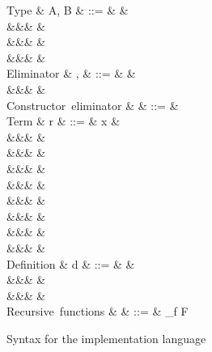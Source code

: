 \begin{figure}
\begin{syntaxfig}
\mbox{Type}
&
A, B
&
::=
&
\tyInt
&
\\
&&&
\tyList
&
\\
&&&
&
\\
&&&
&
\\[2mm]
\mbox{Eliminator}
&
\sigma, \tau
&
::=
&
&
\\
&&&
\elimConstr{\Sigma}
&
\\[2mm]
\mbox{Constructor eliminator}
&
\Sigma
&
::=
&
\\[2mm]
\mbox{Term}
&
r
&
::=
&
x
&
\\
&&&
&
\\
&&&
\phi
&
\\
&&&
\exFun{\sigma}
&
\\
&&&
&
\\
&&&
&
\\
&&&
&
\\
&&&
&
\\
&&&
&
\\[2mm]
\mbox{Definition}
&
d
&
::=
&
&
\\
&&&
\exLetrecDef{\delta}
&
\\
&&&
&
\\[2mm]
\mbox{Recursive functions}
&
\delta
&
::=
&
_{f \in F}
\end{syntaxfig}
\caption{Syntax for the implementation language}
\label{fig:impl-language:syntax}
\end{figure}
